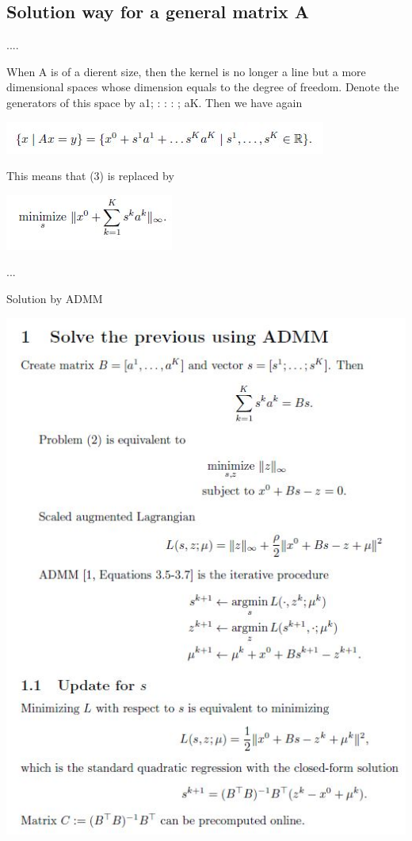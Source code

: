 \documentclass[journal]{IEEEtranTIE}
\begin{document}
\subsection{Solution way for a general matrix A}

....

When A is of a dierent size, then the kernel is no longer a line but
a more dimensional spaces whose dimension equals to the degree of
freedom. Denote the generators of this space by a1; : : : ; aK. Then
we have again

\includegraphics{Figures/temp2}

This means that (3) is replaced by

\includegraphics{Figures/temp1}

...

Solution by ADMM

\includegraphics[width=0.9\columnwidth]{Figures/temp4}
\end{document}
